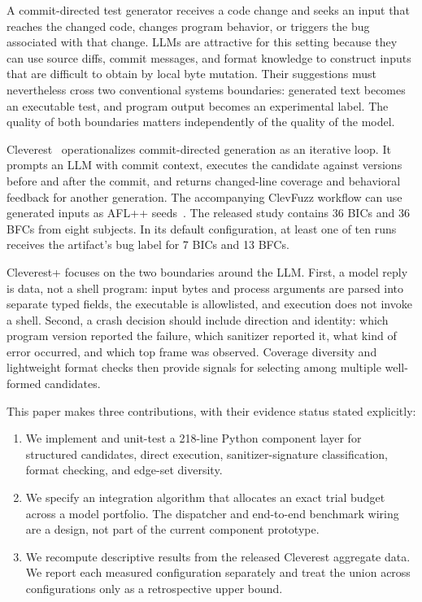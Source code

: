 \documentclass{article}
\begin{document}
A commit-directed test generator receives a code change and seeks an input that
reaches the changed code, changes program behavior, or triggers the bug
associated with that change.  LLMs are attractive for this setting because
they can use source diffs, commit messages, and format knowledge to construct
inputs that are difficult to obtain by local byte mutation.  Their suggestions
must nevertheless cross two conventional systems boundaries: generated text
becomes an executable test, and program output becomes an experimental label.
The quality of both boundaries matters independently of the quality of the
model.

Cleverest~\cite{liu2026cleverest} operationalizes commit-directed generation as
an iterative loop.  It prompts an LLM with commit context, executes the
candidate against versions before and after the commit, and returns changed-line
coverage and behavioral feedback for another generation.  The accompanying
ClevFuzz workflow can use generated inputs as AFL++ seeds~\cite{aflpp}.  The
released study contains 36 BICs and 36 BFCs from eight subjects.  In its default
configuration, at least one of ten runs receives the artifact's bug label for
7 BICs and 13 BFCs.

Cleverest+ focuses on the two boundaries around the LLM.  First, a model reply
is data, not a shell program: input bytes and process arguments are parsed into
separate typed fields, the executable is allowlisted, and execution does not
invoke a shell.  Second, a crash decision should include direction and identity:
which program version reported the failure, which sanitizer reported it, what
kind of error occurred, and which top frame was observed.  Coverage diversity
and lightweight format checks then provide signals for selecting among multiple
well-formed candidates.

This paper makes three contributions, with their evidence status stated
explicitly:
\begin{enumerate}[nosep]
  \item We implement and unit-test a 218-line Python component layer for
  structured candidates, direct execution, sanitizer-signature classification,
  format checking, and edge-set diversity.
  \item We specify an integration algorithm that allocates an exact trial
  budget across a model portfolio.  The dispatcher and end-to-end benchmark
  wiring are a design, not part of the current component prototype.
  \item We recompute descriptive results from the released Cleverest aggregate
  data.  We report each measured configuration separately and treat the union
  across configurations only as a retrospective upper bound.
\end{enumerate}
\end{document}
